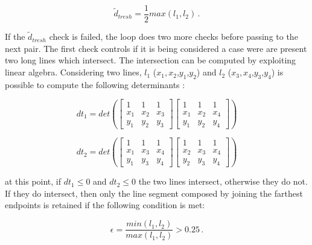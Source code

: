 \begin{equation}
  \tilde{d}_{tresh} = {\frac{1}{2}} max(l_1, l_2) \,.
\end{equation}

If the $\tilde{d}_{tresh}$ check is failed, the loop does two more checks before passing to the next pair. The first check controls if it is being considered a case were are present two long lines which intersect. The intersection can be computed by exploiting linear algebra. Considering two lines, $l_1$ ($x_1,x_2$,$y_1$,$y_2$) and $l_2$ ($x_3,x_4$,$y_3$,$y_4$) is possible to compute the following determinants :

\begin{equation}
  dt_1 = det \left(
  \begin{bmatrix}
      1   & 1   & 1   \\
      x_1 & x_2 & x_3 \\
      y_1 & y_2 & y_3
    \end{bmatrix}
  \begin{bmatrix}
      1   & 1   & 1   \\
      x_1 & x_2 & x_4 \\
      y_1 & y_2 & y_4
    \end{bmatrix}
  \right)
\end{equation}

\begin{equation}
  dt_2 = det \left(
  \begin{bmatrix}
      1   & 1   & 1   \\
      x_1 & x_3 & x_4 \\
      y_1 & y_3 & y_4
    \end{bmatrix}
  \begin{bmatrix}
      1   & 1   & 1   \\
      x_2 & x_3 & x_4 \\
      y_2 & y_3 & y_4
    \end{bmatrix}
  \right)
\end{equation}

at this point, if $dt_1  \leqslant 0$ and $dt_2  \leqslant 0$ the two lines intersect, otherwise they do not.
If they do intersect, then only the line segment composed by joining the farthest endpoints is retained if the following condition is met:

\begin{equation}
  \epsilon = \frac{min(l_1,l_2)}{max(l_1,l_2)} > 0.25 \,.
\end{equation}

